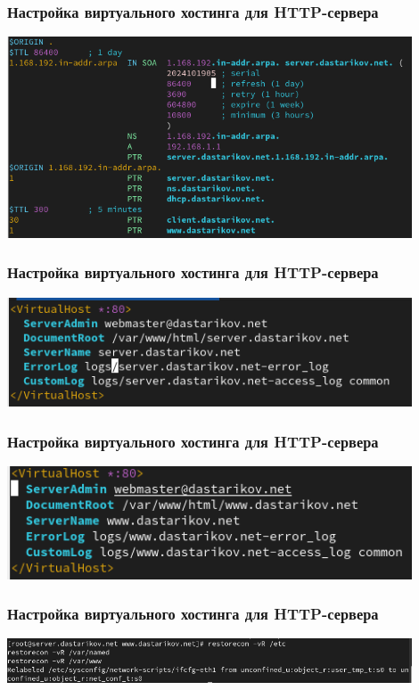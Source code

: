\begin{frame}
\frametitle{Настройка виртуального хостинга для HTTP-сервера}
    \includegraphics[width=0.9\textwidth]{../images/image07.png}
\end{frame}

\begin{frame}
\frametitle{Настройка виртуального хостинга для HTTP-сервера}
    \includegraphics[width=0.9\textwidth]{../images/image08.png}
\end{frame}

\begin{frame}
\frametitle{Настройка виртуального хостинга для HTTP-сервера}
    \includegraphics[width=0.9\textwidth]{../images/image09.png}
\end{frame}

\begin{frame}
\frametitle{Настройка виртуального хостинга для HTTP-сервера}
    \includegraphics[width=0.9\textwidth]{../images/image10.png}
\end{frame}

